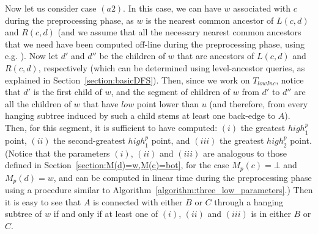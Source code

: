 \documentclass[11pt,a4paper]{article}
\begin{document}
Now let us consider case $(a2)$. In this case, we can have $w$ associated with $c$ during the preprocessing phase, as $w$ is the nearest common ancestor of $L(c,d)$ and $R(c,d)$ (and we assume that all the necessary nearest common ancestors that we need have been computed off-line during the preprocessing phase, using e.g. \cite{DBLP:journals/siamcomp/BuchsbaumGKRTW08}). Now let $d'$ and $d''$ be the children of $w$ that are ancestors of $L(c,d)$ and $R(c,d)$, respectively (which can be determined using level-ancestor queries, as explained in Section~\ref{section:basicDFS}). Then, since we work on $T_\mathit{lowInc}$, notice that $d'$ is the first child of $w$, and the segment of children of $w$ from $d'$ to $d''$ are all the children of $w$ that have $\mathit{low}$ point lower than $u$ (and therefore, from every hanging subtree induced by such a child stems at least one back-edge to $A$). Then, for this segment, it is sufficient to have computed: $(i)$ the greatest $\mathit{high}^p_1$ point, $(ii)$ the second-greatest $\mathit{high}^p_1$ point, and $(iii)$ the greatest $\mathit{high}^p_2$ point. (Notice that the parameters $(i)$, $(ii)$ and $(iii)$ are analogous to those defined in Section~\ref{section:M(d)=w,M(c)=bot}, for the case $M_p(c)=\bot$ and $M_p(d)=w$, and can be computed in linear time during the preprocessing phase using a procedure similar to Algorithm~\ref{algorithm:three_low_parameters}.) Then it is easy to see that $A$ is connected with either $B$ or $C$ through a hanging subtree of $w$ if and only if at least one of $(i)$, $(ii)$ and $(iii)$ is in either $B$ or $C$.
\end{document}
